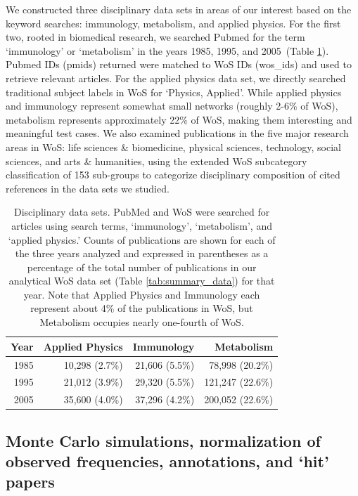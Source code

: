 \documentclass[NETN]{stjour}
\begin{document}
We constructed three disciplinary data sets in areas of our interest based on the keyword searches: immunology,   metabolism, and   applied physics. For the first two, rooted in biomedical research, we searched Pubmed for the term `immunology' or `metabolism' in the years 1985, 1995, and 2005~(Table \ref{tab:disc-data sets}). Pubmed IDs (pmids) returned were matched to WoS IDs (wos\_ids) and used to retrieve relevant articles. For the applied physics data set, we directly searched traditional subject labels in WoS for `Physics, Applied'. While applied physics and immunology represent somewhat small networks (roughly 2-6\% of WoS), metabolism represents approximately 22\% of WoS, making them interesting and meaningful test cases. We also examined publications in the five major research areas in WoS: life sciences \& biomedicine, physical sciences, technology, social sciences, and arts \& humanities,  using the extended WoS subcategory classification of 153 sub-groups to categorize disciplinary composition of cited references in the data sets we studied.
\vspace{-2 mm}
\begin{table}[ht]
\caption{Disciplinary data sets. PubMed and WoS were searched for articles using search terms, `immunology', `metabolism', and `applied physics.' Counts of publications are shown for each of the three years analyzed and expressed in parentheses as a percentage of the total number of publications in our analytical WoS data set (Table \ref{tab:summary_data}) for that year. Note that Applied Physics and Immunology each represent about 4\% of the publications in WoS, but Metabolism occupies nearly one-fourth of WoS.}
\label{tab:disc-data sets}
\centering
\begin{tabular}{|r r r r|}
  \hline
Year & Applied Physics & Immunology & Metabolism   \\ 
  \hline
1985 & 10,298 (2.7\%) & 21,606 (5.5\%) & 78,998 (20.2\%)  \\ 
1995 & 21,012 (3.9\%)  & 29,320 (5.5\%)  & 121,247 (22.6\%)   \\ 
2005 & 35,600 (4.0\%) & 37,296 (4.2\%) & 200,052 (22.6\%)    \\ 
 \hline
\end{tabular}
\vspace{-6mm}
\end{table}

\subsection{Monte Carlo simulations, normalization of observed frequencies, annotations, and `hit' papers}
\end{document}

